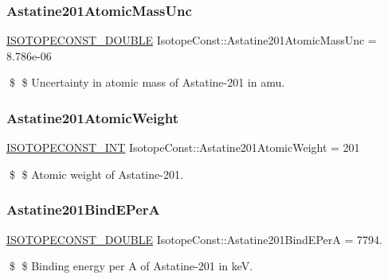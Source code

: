 \subsubsection{\texorpdfstring{Astatine201\+Atomic\+Mass\+Unc}{Astatine201AtomicMassUnc}}
{\footnotesize\ttfamily \mbox{\hyperlink{group___isotope_const-_macros_ga8f45a7272ce02c0b4c65c44636ed719a}{I\+S\+O\+T\+O\+P\+E\+C\+O\+N\+S\+T\+\_\+\+D\+O\+U\+B\+LE}} Isotope\+Const\+::\+Astatine201\+Atomic\+Mass\+Unc = 8.\+786e-\/06}

\$ \$ Uncertainty in atomic mass of Astatine-\/201 in amu. \mbox{\label{group___isotope_const-_astatine-_at201_gae851a198899ce8f2b96bc691d583dbbd}} 
\subsubsection{\texorpdfstring{Astatine201\+Atomic\+Weight}{Astatine201AtomicWeight}}
{\footnotesize\ttfamily \mbox{\hyperlink{group___isotope_const-_macros_ga5f18360b3e99483a35c32d789e62621c}{I\+S\+O\+T\+O\+P\+E\+C\+O\+N\+S\+T\+\_\+\+I\+NT}} Isotope\+Const\+::\+Astatine201\+Atomic\+Weight = 201}

\$ \$ Atomic weight of Astatine-\/201. \mbox{\label{group___isotope_const-_astatine-_at201_ga43f7535258d370b52797a85b75b7144c}} 
\subsubsection{\texorpdfstring{Astatine201\+Bind\+E\+PerA}{Astatine201BindEPerA}}
{\footnotesize\ttfamily \mbox{\hyperlink{group___isotope_const-_macros_ga8f45a7272ce02c0b4c65c44636ed719a}{I\+S\+O\+T\+O\+P\+E\+C\+O\+N\+S\+T\+\_\+\+D\+O\+U\+B\+LE}} Isotope\+Const\+::\+Astatine201\+Bind\+E\+PerA = 7794.}

\$ \$ Binding energy per A of Astatine-\/201 in keV. \mbox{\label{group___isotope_const-_astatine-_at201_gadfc259f777dbb27a84094ed40979b23e}} 
